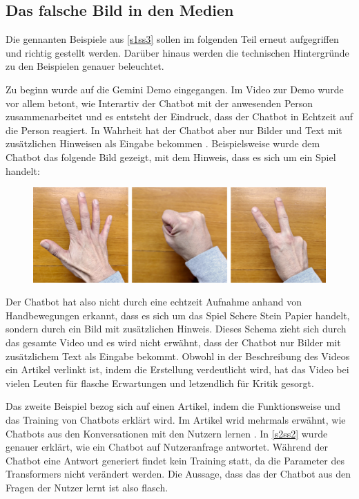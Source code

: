 	\subsection{Das falsche Bild in den Medien}\label{s3ss2}
	Die gennanten Beispiele aus \ref{s1ss3} sollen im folgenden Teil erneut aufgegriffen und richtig gestellt werden. Darüber
	hinaus werden die technischen Hintergründe zu den Beispielen genauer beleuchtet. 

	\noindent
	Zu beginn wurde auf die Gemini Demo eingegangen. Im Video zur Demo wurde vor allem betont, wie Interartiv der Chatbot mit
	der anwesenden Person zusammenarbeitet und es entsteht der Eindruck, dass der Chatbot in Echtzeit auf die Person reagiert.
	In Wahrheit hat der Chatbot aber nur Bilder und Text mit zusätzlichen Hinweisen als Eingabe bekommen \cite{chenGoogle23}. Beispielsweise wurde
	dem Chatbot das folgende Bild gezeigt, mit dem Hinweis, dass es sich um ein Spiel handelt:
	\begin{figure}[h]
    	\includegraphics[scale=0.25]{assets/hand_rock_paper_scissors.png}
    \end{figure}
	\newline
	Der Chatbot hat also nicht durch eine echtzeit Aufnahme anhand von Handbewegungen erkannt, dass es sich um das Spiel \glqq{}Schere
	Stein Papier\grqq{} handelt, sondern durch ein Bild mit zusätzlichen Hinweis. Dieses Schema zieht sich durch das gesamte Video und
	es wird nicht erwähnt, dass der Chatbot nur Bilder mit zusätzlichem Text als Eingabe bekommt. Obwohl in der Beschreibung des
	Videos ein Artikel verlinkt ist, indem die Erstellung verdeutlicht wird, hat das Video bei vielen Leuten für flasche
	Erwartungen und letzendlich für Kritik gesorgt.

	Das zweite Beispiel bezog sich auf einen Artikel, indem die Funktionsweise und das Training von Chatbots erklärt wird. Im 
	Artikel wrid mehrmals erwähnt, wie Chatbots aus den Konversationen mit den Nutzern lernen \cite{gramsch23}. In \ref{s2ss2} wurde genauer 
	erklärt, wie ein Chatbot auf Nutzeranfrage antwortet. Während der Chatbot eine Antwort generiert findet kein Training statt, da die Parameter
	des Transformers nicht verändert werden. Die Aussage, dass das der Chatbot aus den Fragen der Nutzer lernt ist also flasch.	

